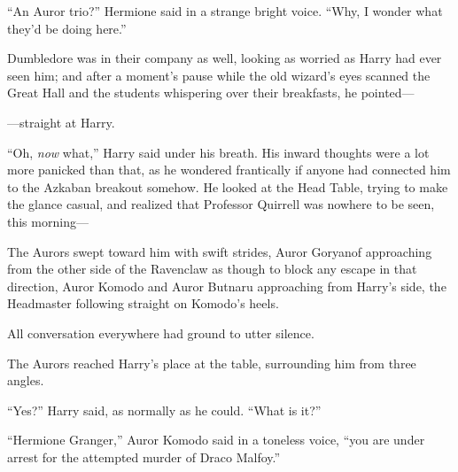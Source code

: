 “An Auror trio?” Hermione said in a strange bright voice. “Why,
I wonder what they’d be doing here.”

Dumbledore was in their company as well, looking as worried as
Harry had ever seen him; and after a moment’s pause while the old
wizard’s eyes scanned the Great Hall and the students whispering
over their breakfasts, he pointed—

—straight at Harry.

“Oh, \emph{now} what,” Harry said under his breath. His inward
thoughts were a lot more panicked than that, as he wondered
frantically if anyone had connected him to the Azkaban breakout
somehow. He looked at the Head Table, trying to make the glance
casual, and realized that Professor Quirrell was nowhere to be
seen, this morning—

The Aurors swept toward him with swift strides, Auror Goryanof
approaching from the other side of the Ravenclaw as though to block
any escape in that direction, Auror Komodo and Auror Butnaru
approaching from Harry’s side, the Headmaster following straight on
Komodo’s heels.

All conversation everywhere had ground to utter silence.

The Aurors reached Harry’s place at the table, surrounding him
from three angles.

“Yes?” Harry said, as normally as he could. “What is it?”

“Hermione Granger,” Auror Komodo said in a toneless voice, “you
are under arrest for the attempted murder of Draco Malfoy.”
